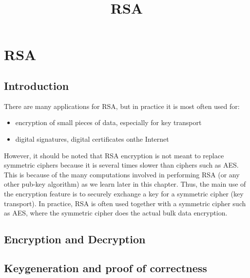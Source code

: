 \documentclass{article}
\title{RSA}
\begin{document}

\maketitle                   %




\section{RSA}

\subsection{Introduction}

There are many applications for RSA, but in practice it is most often used for:

\begin{itemize}
    \item  encryption of small pieces of data, especially for key transport
    \item  digital signatures, digital certificates onthe Internet
\end{itemize}
 
However, it should be noted that RSA encryption is not meant to replace symmetric ciphers because it is several times slower than ciphers such as AES. This is because of the many computations involved in performing RSA (or any other pub-key algorithm) as we learn later in this chapter. Thus, the main use of the encryption feature is to securely exchange a key for a symmetric cipher (key transport). In practice, RSA is often used together with a symmetric cipher such as AES, where the symmetric cipher does the actual bulk data encryption.
 

\subsection{Encryption and Decryption}








\subsection{Keygeneration and proof of correctness}
\end{document}
